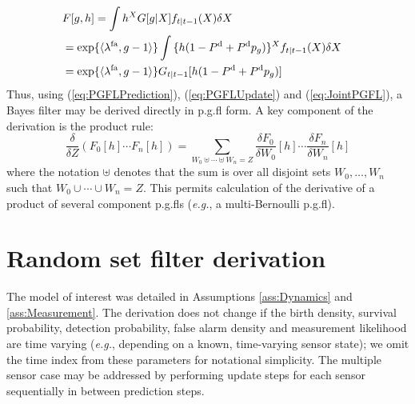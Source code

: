 \documentclass[journal,twoside]{IEEEtran}
\theoremstyle{plain}
\begin{document}
\else
\begin{align}
\lefteqn{F[g,h] = \int{h^X G[g|X] f_{t|t-1}(X)\delta X}} \\
&= \exp\{\langle\lambda^\mathrm{fa},g-1\rangle\}\int{\{h(1-P^{\mathrm{d}} + P^{\mathrm{d}} p_g)\}^X f_{t|t-1}(X)\delta X} \\
&= \exp\{\langle\lambda^\mathrm{fa},g-1\rangle\} G_{t|t-1}[h(1-P^{\mathrm{d}} + P^{\mathrm{d}} p_g)] \label{eq:JointPGFL}
\end{align}
\fi
%
Thus, using (\ref{eq:PGFLPrediction}), (\ref{eq:PGFLUpdate}) and (\ref{eq:JointPGFL}), a Bayes filter may be derived directly in p.g.fl form. A key component of the derivation is the product rule: \cite[p395]{Mah07}
%
\begin{equation}
\frac{\delta}{\delta Z}(F_0[h]\cdots F_n[h]) = \sum_{W_0 \uplus \cdots \uplus W_n = Z}
\frac{\delta F_0}{\delta W_0}[h] \cdots
\frac{\delta F_n}{\delta W_n}[h]
\label{eq:ProductRule}
\end{equation}
%
where the notation $\uplus$ denotes that the sum is over all disjoint sets $W_0,\dots,W_n$ such that $W_0 \cup \cdots \cup W_n=Z$. This permits calculation of the derivative of a product of several component p.g.fls (\textit{e.g.}\xspace, a multi-Bernoulli p.g.fl).


\section{Random set filter derivation}
\label{sec:Derivation}
%
The model of interest was detailed in Assumptions \ref{ass:Dynamics} and \ref{ass:Measurement}. The derivation does not change if the birth density, survival probability, detection probability, false alarm density and measurement likelihood are time varying (\textit{e.g.}\xspace, depending on a known, time-varying sensor state); we omit the time index from these parameters for notational simplicity. The multiple sensor case may be addressed by performing update steps for each sensor sequentially in between prediction steps.
\end{document}
